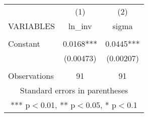 \begin{tabular}{lcc} \hline
 & (1) & (2) \\
VARIABLES & ln\_inv & sigma \\ \hline
 &  &  \\
Constant & 0.0168*** & 0.0445*** \\
 & (0.00473) & (0.00207) \\
 &  &  \\
 Observations & 91 & 91 \\ \hline
\multicolumn{3}{c}{ Standard errors in parentheses} \\
\multicolumn{3}{c}{ *** p$<$0.01, ** p$<$0.05, * p$<$0.1} \\
\end{tabular}
